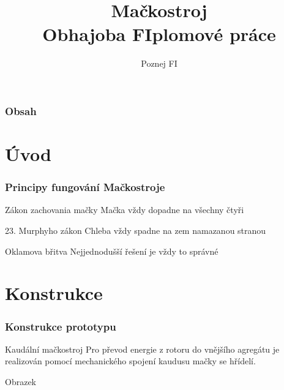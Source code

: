 \documentclass{beamer}
\title[FIplomová práce]{\textbf{Mačkostroj}\\Obhajoba FIplomové práce}
\author{Poznej FI} %
\institute[FI MU] %
{
    Fakulta informatiky, Masarykova univerzita \\ %
    \medskip
    \textit{poznej@fi.muni.cz} %
}
\date{} %
\newcommand{\mypause}{\pause}
\begin{document}
    
    \begin{frame}
    \titlepage %
\end{frame}

\begin{frame}
\frametitle{Obsah} %
\tableofcontents %
\end{frame}


\section{Úvod}
\begin{frame}
    \frametitle{Principy fungování Mačkostroje}
    \begin{block}{Zákon zachovania mačky}
        Mačka vždy dopadne na všechny čtyři
    \end{block}
    \mypause
    \begin{block}{23. Murphyho zákon}
        Chleba vždy spadne na zem namazanou stranou
    \end{block}
    \mypause
    \begin{block}{Oklamova břitva}
        Nejjednodušší řešení je vždy to správné
    \end{block}
\end{frame}

\section{Konstrukce}
\begin{frame}
    \frametitle{Konstrukce prototypu}
    \begin{block}{Kaudální mačkostroj}
        Pro převod energie z rotoru do vnějšího agregátu je realizován pomocí mechanického spojení kaudusu mačky se hřídelí.
    \end{block}
    \mypause
    Obrazek
\end{frame}
\end{document}
